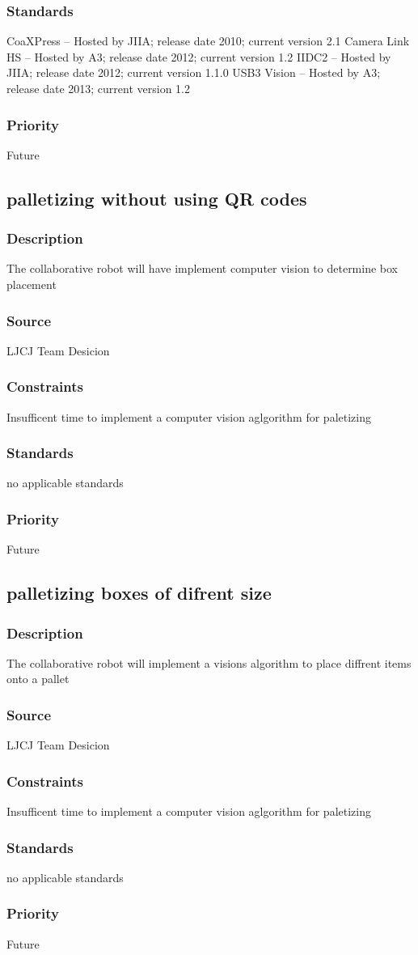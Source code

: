 \subsubsection{Standards}
CoaXPress – Hosted by JIIA; release date 2010; current version 2.1
Camera Link HS – Hosted by A3; release date 2012; current version 1.2
IIDC2 – Hosted by JIIA; release date 2012; current version 1.1.0
USB3 Vision – Hosted by A3; release date 2013; current version 1.2
\subsubsection{Priority}
Future

\subsection{palletizing without using QR codes}
\subsubsection{Description}
The collaborative robot will have implement computer vision to determine box placement
\subsubsection{Source}
LJCJ Team Desicion
\subsubsection{Constraints}
Insufficent time to implement a computer vision aglgorithm for paletizing
\subsubsection{Standards}
no applicable standards
\subsubsection{Priority}
Future

\subsection{palletizing boxes of difrent size}
\subsubsection{Description}
The collaborative robot will implement a visions algorithm to place diffrent items onto a pallet
\subsubsection{Source}
LJCJ Team Desicion
\subsubsection{Constraints}
Insufficent time to implement a computer vision aglgorithm for paletizing
\subsubsection{Standards}
no applicable standards
\subsubsection{Priority}
Future